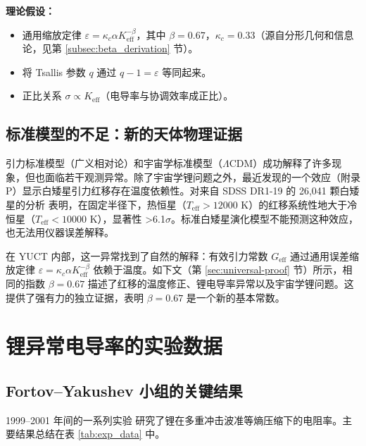 \documentclass[12pt,a4paper]{article}
\theoremstyle{remark}
\newcommand{\Ke}{K_{\mathrm{eff}}}
\newcommand{\kappac}{\kappa_c}
\newcommand{\alp}{\alpha}
\begin{document}
	\textbf{理论假设：}
	\begin{itemize}
		\item 通用缩放定律 \(\varepsilon = \kappac \alp \Ke^{-\beta}\)，其中 \(\beta = 0.67\)，\(\kappac = 0.33\)（源自分形几何和信息论，见第 \ref{subsec:beta_derivation} 节）。
		\item 将 Tsallis 参数 \(q\) 通过 \(q-1 = \varepsilon\) 等同起来。
		\item 正比关系 \(\sigma \propto \Ke\)（电导率与协调效率成正比）。
	\end{itemize}
	
	\subsection{标准模型的不足：新的天体物理证据}
	\label{subsec:std-inadequacy}
	
	引力标准模型（广义相对论）和宇宙学标准模型（\(\Lambda\)CDM）成功解释了许多现象，但也面临若干观测异常。除了宇宙学锂问题之外，最近发现的一个效应（附录 P）显示白矮星引力红移存在温度依赖性。对来自 SDSS DR1-19 的 26,041 颗白矮星的分析 \cite{Crumpler2024} 表明，在固定半径下，热恒星（\(T_{\mathrm{eff}} > 12000\) K）的红移系统性地大于冷恒星（\(T_{\mathrm{eff}} < 10000\) K），显著性 >6.1\(\sigma\)。标准白矮星演化模型不能预测这种效应，也无法用仪器误差解释。
	
	在 YUCT 内部，这一异常找到了自然的解释：有效引力常数 \(G_{\mathrm{eff}}\) 通过通用误差缩放定律 \(\varepsilon = \kappac \alp \Ke^{-\beta}\) 依赖于温度。如下文（第 \ref{sec:universal-proof} 节）所示，相同的指数 \(\beta = 0.67\) 描述了红移的温度修正、锂电导率异常以及宇宙学锂问题。这提供了强有力的独立证据，表明 \(\beta = 0.67\) 是一个新的基本常数。
	
	\section{锂异常电导率的实验数据}
	
	\subsection{Fortov–Yakushev 小组的关键结果}
	
	1999–2001 年间的一系列实验 \cite{fortov1999, fortov2001, yakushev2002} 研究了锂在多重冲击波准等熵压缩下的电阻率。主要结果总结在表 \ref{tab:exp_data} 中。
	
\end{document}
